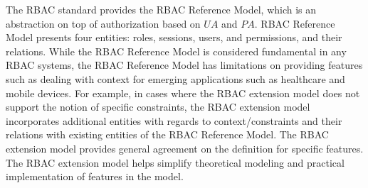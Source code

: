 The RBAC standard provides the RBAC Reference Model, which is an abstraction on top of authorization based on $UA$ and $PA$. RBAC Reference Model presents four entities: roles, sessions, users, and permissions, and their relations. While the RBAC Reference Model is considered fundamental in any RBAC systems, the RBAC Reference Model has limitations on providing features such as dealing with context for emerging applications such as healthcare and mobile devices. For example, in cases where the RBAC extension model does not support the notion of specific constraints, the RBAC extension model incorporates additional entities with regards to context/constraints and their relations with existing entities of the RBAC Reference Model. The RBAC extension model provides general agreement on the definition for specific features. The RBAC extension model helps simplify theoretical modeling and practical implementation of features in the model. 



%
%
%
%

